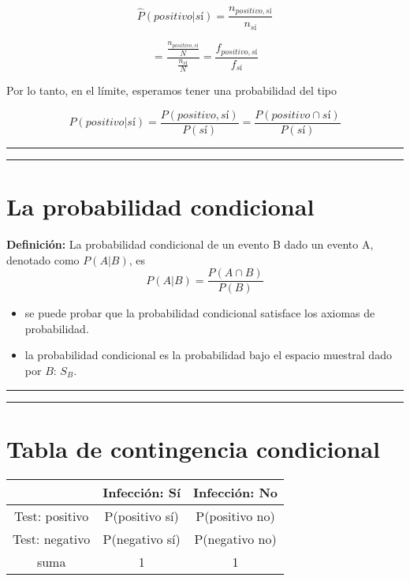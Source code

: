 \documentclass[
]{book}
\providecommand{\tightlist}{%
  \setlength{\itemsep}{0pt}\setlength{\parskip}{0pt}}
\begin{document}
\[\hat{P}(positivo|sí)=\frac{n_{positivo,sí}}{n_{sí}}\]

\[=\frac{\frac{n_{positivo,sí}}{N}}{\frac{n_{sí}}{N}}=\frac{f_{positivo,sí}}{f_{sí}} \]

Por lo tanto, en el límite, esperamos tener una probabilidad del tipo

\[P(positivo|sí)=\frac{P(positivo, sí)}{P(sí)}=\frac{P(positivo \cap sí)}{P(sí)}\]

\begin{center}\rule{0.5\linewidth}{0.5pt}\end{center}

\begin{center}\rule{0.5\linewidth}{0.5pt}\end{center}

\hypertarget{la-probabilidad-condicional-1}{%
\section{La probabilidad condicional}\label{la-probabilidad-condicional-1}}

\textbf{Definición:}
La probabilidad condicional de un evento B dado un evento A, denotado como \(P(A|B)\), es
\[P(A|B) = \frac{P(A\cap B)}{P(B)}\]

\begin{itemize}
\tightlist
\item
  se puede probar que la probabilidad condicional satisface los axiomas de probabilidad.
\item
  la probabilidad condicional es la probabilidad bajo el espacio muestral dado por \(B\): \(S_B\).
\end{itemize}

\begin{center}\rule{0.5\linewidth}{0.5pt}\end{center}

\begin{center}\rule{0.5\linewidth}{0.5pt}\end{center}

\hypertarget{tabla-de-contingencia-condicional}{%
\section{Tabla de contingencia condicional}\label{tabla-de-contingencia-condicional}}

\begin{longtable}[]{@{}ccc@{}}
\toprule
& Infección: Sí & Infección: No \\
\midrule
\endhead
Test: positivo & P(positivo {\textbar{}} sí) & P(positivo {\textbar{}} no) \\
Test: negativo & P(negativo {\textbar{}} sí) & P(negativo {\textbar{}} no) \\
suma & 1 & 1 \\
\bottomrule
\end{longtable}
\end{document}
